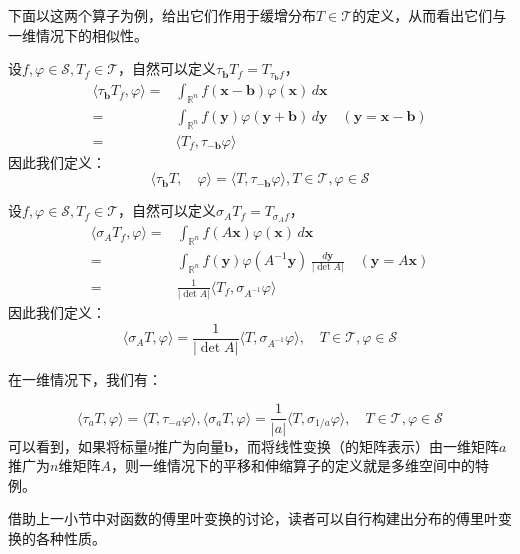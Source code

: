 下面以这两个算子为例，给出它们作用于缓增分布$T\in\mathcal{T} $的定义，从而看出它们与一维情况下的相似性。
\begin{example}[平移算子]
    设$f,\varphi\in\mathcal{S} ,T_f\in\mathcal{T} $，自然可以定义$\tau_{\mathbf{b}} T_f=T_{\tau_{\mathbf{b}} f}$，
    \begin{align*}
        \langle \tau_{\mathbf{b}} T_f,\varphi\rangle=&\int_{\mathbb{R}^n}f(\mathbf{x}-\mathbf{b})\varphi(\mathbf{x})\,d\mathbf{x}\\
        =&\int_{\mathbb{R}^n}f(\mathbf{y})\varphi(\mathbf{y}+\mathbf{b})\,d\mathbf{y}\quad (\mathbf{y}=\mathbf{x}-\mathbf{b})\\
        =&\langle T_f,\tau_{-\mathbf{b}}\varphi\rangle
    \end{align*}
    因此我们定义：
    \[\langle \tau_{\mathbf{b}} T,\quad \varphi\rangle=\langle T,\tau_{-\mathbf{b}}\varphi\rangle,T\in\mathcal{T} ,\varphi\in\mathcal{S} \]
\end{example}

\begin{example}[伸缩算子]
    设$f,\varphi\in\mathcal{S} ,T_f\in\mathcal{T} $，自然可以定义$\sigma_A T_f=T_{\sigma_A f}$，
    \begin{align*}
        \langle \sigma_A T_f,\varphi\rangle=&\int_{\mathbb{R}^n}f(A\mathbf{x})\varphi(\mathbf{x})\,d\mathbf{x}\\
        =&\int_{\mathbb{R}^n}f(\mathbf{y})\varphi(A^{-1}\mathbf{y})\,\frac{d\mathbf{y}}{|\det A|}\quad (\mathbf{y}=A\mathbf{x})\\
        =&\frac{1}{|\det A|}\langle T_f,\sigma_{A^{-1}}\varphi\rangle
    \end{align*}
    因此我们定义：
    \[\langle \sigma_A T,\varphi\rangle=\frac{1}{|\det A|}\langle T,\sigma_{A^{-1}}\varphi\rangle,\quad T\in\mathcal{T} ,\varphi\in\mathcal{S} \]
\end{example}
在一维情况下，我们有：

\[\langle \tau_a T,\varphi\rangle=\langle T,\tau_{-a}\varphi\rangle,\langle\sigma_{a} T,\varphi\rangle=\frac{1}{|a|}\langle T,\sigma_{1/a}\varphi\rangle,\quad T\in\mathcal{T} ,\varphi\in\mathcal{S} \]
可以看到，如果将标量$b$推广为向量$\mathbf{b}$，而将线性变换（的矩阵表示）由一维矩阵$a$推广为$n$维矩阵$A$，则一维情况下的平移和伸缩算子的定义就是多维空间中的特例。

借助上一小节中对函数的傅里叶变换的讨论，读者可以自行构建出分布的傅里叶变换的各种性质。

